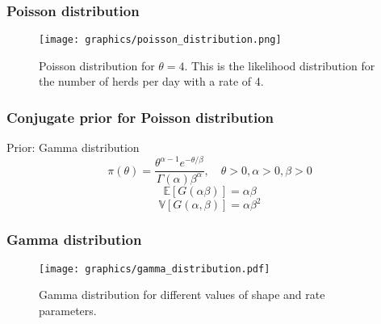 \documentclass{beamer}
\newcommand{\E}{\mathbb{E}}
\newcommand{\V}{\mathbb{V}}
\newcommand{\1}{\ensuremath{\mathbf{1}}}
\begin{document}
%
%
%
\begin{frame}\frametitle{Poisson distribution}
	\begin{figure}
	\begin{center}
		\texttt{[image: graphics/poisson\_distribution.png]}
	\end{center}
	\caption{Poisson distribution for $\theta = 4$. This is the likelihood distribution for the number of herds per day with a rate of 4.}
	\end{figure}
\end{frame}
%
%
%
\begin{frame}\frametitle{Conjugate prior for Poisson distribution}
	Prior: Gamma distribution
	\begin{equation}
		\pi(\theta) = \frac{\theta^{\alpha-1}e^{-\theta/\beta}}{\Gamma(\alpha)\beta^\alpha}, \quad \theta >0, \alpha>0, \beta>0
	\end{equation}
	\begin{equation}
		\E[G(\alpha\beta)] = \alpha\beta
	\end{equation}
	\begin{equation}
		\V[G(\alpha,\beta)] = \alpha\beta^2
	\end{equation}
\end{frame}
%
%
%
\begin{frame}\frametitle{Gamma distribution}
	\begin{figure}
	\begin{center}
		\texttt{[image: graphics/gamma\_distribution.pdf]}
	\end{center}
	\caption{Gamma distribution for different values of shape and rate parameters.}
	\end{figure}
\end{frame}
%
%
%
\end{document}
